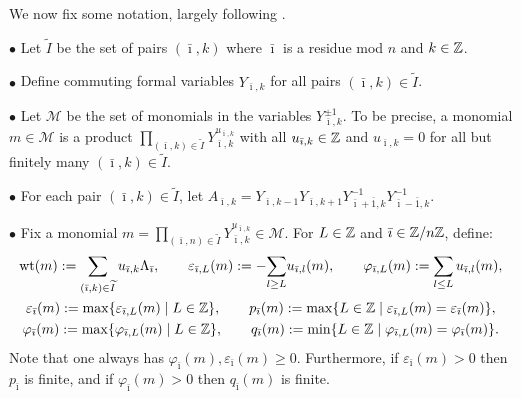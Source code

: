 \documentclass[11pt]{article}
\theoremstyle{definition}
\newcommand{\wt}{\operatorname{wt}}
\newcommand{\bz}{\Bbb{Z}}
\begin{document}
We now f\/ix some notation, largely following \cite[Section~3]{Nakajima:2003}.


$\bullet$ Let $\widetilde I$ be the set of pairs $(\bar \imath, k)$ where $\bar \imath$ is a residue mod $n$ and $k \in \bz$.

$\bullet$ Def\/ine commuting formal variables $Y_{\bar \imath,k}$ for all pairs $(\bar \imath, k) \in \widetilde I$.

$\bullet$ Let $\mathcal{M}$ be the set of monomials in the variables $Y_{\bar \imath, k}^{\pm 1}$. To be precise, a monomial $m \in \mathcal{M}$ is a product $\prod\limits_{(\bar \imath, k) \in \widetilde I} Y_{\bar \imath, k}^{u_{\bar \imath, k}}$ with all $u_{\bar \imath, k} \in \bz$ and $u_{\bar \imath, k}=0$ for all but f\/initely many $(\bar \imath, k) \in \widetilde I$.

$\bullet$ For each pair $(\bar \imath, k) \in \widetilde I$, let $A_{\bar \imath,k}= Y_{\bar \imath,k-1} Y_{\bar \imath, k+1} Y_{\bar \imath+\bar 1, k}^{-1} Y_{\bar \imath-\bar 1, k}^{-1}$.

$\bullet$ Fix a monomial $m = \prod\limits_{(\bar \imath, n) \in \widetilde I} Y_{\bar \imath, k}^{u_{\bar \imath, k}} \in \mathcal{M}$. For $L \in \bz$ and $\bar \imath \in \bz / n \bz$, def\/ine:
\begin{gather*}
\wt(m):=\sum_{(\bar \imath, k) \in \widetilde I} u_{\bar \imath, k} \Lambda_{\bar \imath},
\qquad
\varepsilon_{\bar \imath,L}(m) := -{\sum_{l\geq L}}u_{\bar \imath,l}(m),
\qquad
\varphi_{\bar \imath,L}(m) := \sum_{l\leq L} u_{\bar \imath,l}(m),
\\
\varepsilon_{\bar \imath}(m) := \max\{ \varepsilon_{\bar \imath,L}(m) \mid L\in\bz\},
\qquad
p_{\bar \imath}(m) := \max\{L\in\bz\mid \varepsilon_{\bar \imath,L}(m)=\varepsilon_{\bar \imath}(m)\},
\\
\varphi_{\bar \imath}(m) := \max\{ \varphi_{\bar \imath,L}(m) \mid L\in\bz\},
\qquad
q_{\bar \imath}(m) := \min\{L\in\bz\mid \varphi_{\bar \imath,L}(m)=\varphi_{\bar \imath}(m)\}.
\end{gather*}
Note that one always has $\varphi_{\bar \imath}(m), \varepsilon_{\bar \imath}(m) \geq 0$. Furthermore, if $\varepsilon_{\bar \imath}(m)>0$ then $p_{\bar \imath}$ is f\/inite, and if $\varphi_{\bar \imath}(m)>0$ then $q_{\bar \imath}(m)$ is f\/inite.
\end{document}
